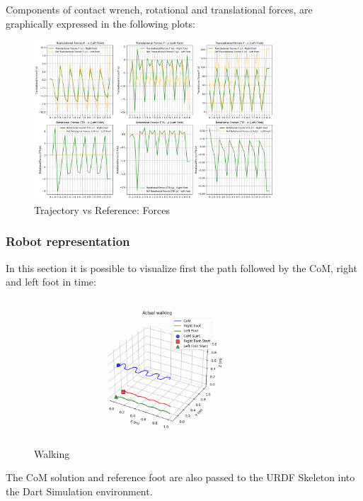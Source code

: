 \documentclass[main.tex]{subfiles}
\begin{document}
Components of contact wrench, rotational and translational forces, are graphically expressed in the following plots:
\begin{figure}[htbp]
    \centering
    \includegraphics[width=0.8\textwidth]{figures/contact_forces_walking.png}
    \caption{Trajectory vs Reference: Forces}
    \label{fig:contact_forces_walking}
\end{figure}

\newpage
\subsubsection*{Robot representation}
In this section it is possible to visualize first the path followed by the CoM, right and left foot in time:
\begin{figure}[htbp]
    \centering
    \includegraphics[width=0.8\textwidth]{figures/walking.PNG}
    \caption{Walking}
    \label{fig:walking}
\end{figure}

The CoM solution and reference foot are also passed to the URDF Skeleton into the Dart Simulation environment. 

\centering
{}
 
\end{document}
